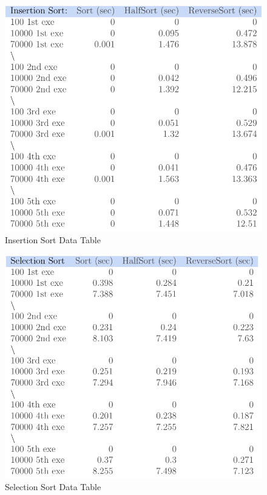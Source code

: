 \documentclass[12pt]{article}
\begin{document}
\begin{figure}[h]
	\centering
	\includegraphics[scale=.7]{ISdatatable.PNG}
	\caption{Insertion Sort Data Table}
	\label{fig:mesh1}
\end{figure}
\begin{figure}[h]
	\centering
	\includegraphics[scale=.7]{SSdatatable.PNG}
	\caption{Selection Sort Data Table}
	\label{fig:mesh1}
\end{figure}
\end{document}
